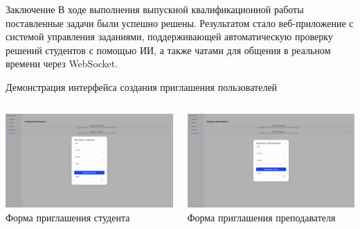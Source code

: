\documentclass[aspectratio=169]{beamer}
\begin{document}
\begin{frame}{Заключение}
\small
В ходе выполнения выпускной квалификационной работы поставленные задачи были успешно решены. Результатом стало веб-приложение с системой управления заданиями, поддерживающей автоматическую проверку решений студентов с помощью ИИ, а также чатами для общения в реальном времени через WebSocket.
\end{frame}


\begin{frame}{Демонстрация интерфейса создания приглашения пользователей}
\vspace{0.5em}

\begin{columns}
    \begin{column}{0.5\textwidth}
        \centering
        \includegraphics[width=0.95\linewidth]{static/InviteStudentPage.png} \\
        \small Форма приглашения студента
    \end{column}
    \begin{column}{0.5\textwidth}
        \centering
        \includegraphics[width=0.95\linewidth]{static/InviteTeacherPage.png} \\
        \small Форма приглашения преподавателя
    \end{column}
\end{columns}
\end{frame}
\end{document}
